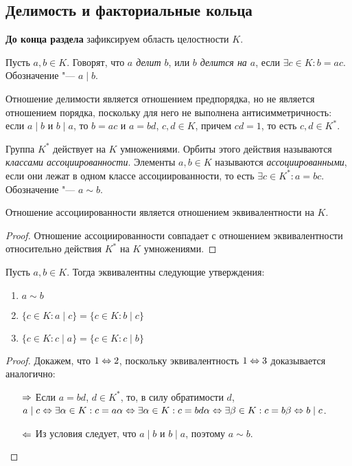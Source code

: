 \subsection{Делимость и факториальные кольца}

\textbf{До конца раздела} зафиксируем область целостности $K$.

\begin{definition}
	Пусть $a, b \in K$. Говорят, что \textit{$a$ делит $b$}, или \textit{$b$ делится на $a$}, если $\exists c \in K: b = ac$. Обозначение "--- $a \mid b$.
\end{definition}

\begin{note}
	Отношение делимости является отношением предпорядка, но не является отношением порядка, поскольку для него не выполнена антисимметричность: если $a \mid b$ и $b \mid a$, то $b = ac$ и $a = bd$, $c, d \in K$, причем $cd = 1$, то есть $c, d \in K^*$.
\end{note}

\begin{definition}
	Группа $K^*$ действует на $K$ умножениями. Орбиты этого действия называются \textit{классами ассоциированности}. Элементы $a, b \in K$ называются \textit{ассоциированными}, если они лежат в одном классе ассоциированности, то есть $\exists c \in K^*: a = bc$. Обозначение "--- $a \sim b$.
\end{definition}

\begin{proposition}
	Отношение ассоциированности является отношением эквивалентности на $K$.
\end{proposition}

\begin{proof}
	Отношение ассоциированности совпадает с отношением эквивалентности относительно действия $K^*$ на $K$ умножениями.
\end{proof}

\begin{proposition}
	Пусть $a, b \in K$. Тогда эквивалентны следующие утверждения:
	\begin{enumerate}
		\item $a \sim b$
		\item $\{c \in K: a \mid c\} = \{c \in K: b \mid c\}$
		\item $\{c \in K: c \mid a\} = \{c \in K: c \mid b\}$
	\end{enumerate}
\end{proposition}

\begin{proof} Докажем, что $1 \Leftrightarrow 2$, поскольку эквивалентность $1 \Leftrightarrow 3$ доказывается аналогично:
	\begin{itemize}
		\item[$\Rightarrow$] Если $a = bd$, $d \in K^*$, то, в силу обратимости $d$, $a \mid c \Leftrightarrow \exists \alpha \in K: c = a\alpha \Leftrightarrow \exists \alpha \in K: c = bd\alpha \Leftrightarrow \exists \beta \in K: c = b\beta \Leftrightarrow b \mid c$.
		\item[$\Leftarrow$] Из условия следует, что $a \mid b$ и $b \mid a$, поэтому $a \sim b$.\qedhere
	\end{itemize}
\end{proof}

